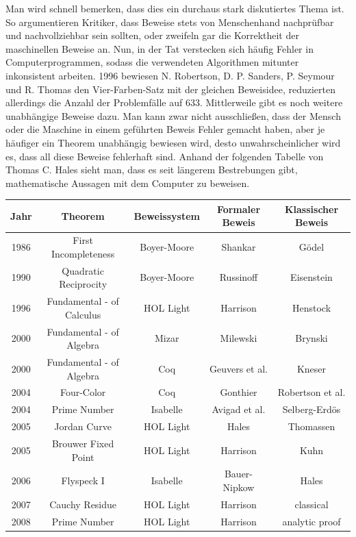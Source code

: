 Man wird schnell bemerken, dass dies ein durchaus stark diskutiertes Thema ist. So argumentieren Kritiker, dass Beweise stets von Menschenhand nachprüfbar und nachvollziehbar sein sollten, oder zweifeln gar die Korrektheit der maschinellen Beweise an. Nun, in der Tat verstecken sich häufig Fehler in Computerprogrammen, sodass die verwendeten Algorithmen mitunter inkonsistent arbeiten. 1996 bewiesen N. Robertson, D. P. Sanders, P. Seymour und R. Thomas den Vier-Farben-Satz mit der gleichen Beweisidee, reduzierten allerdings die Anzahl der Problemfälle auf 633. Mittlerweile gibt es noch weitere unabhängige Beweise dazu. Man kann zwar nicht ausschließen, dass der Mensch oder die Maschine in einem geführten Beweis Fehler gemacht haben, aber je häufiger ein Theorem unabhängig bewiesen wird, desto
unwahrscheinlicher wird es, dass all diese Beweise fehlerhaft sind. Anhand der folgenden Tabelle von Thomas C. Hales\cite{hales_formalproof} sieht man, dass es seit längerem Bestrebungen gibt, mathematische Aussagen mit dem Computer zu beweisen.

\begin{table}
\begin{tabular}{ccccc}
\toprule
Jahr & Theorem & Beweissystem & Formaler Beweis & Klassischer Beweis \\ \midrule
1986 & First Incompleteness & Boyer-Moore & Shankar & Gödel \\
1990 & Quadratic Reciprocity & Boyer-Moore & Russinoff & Eisenstein \\
1996 & Fundamental - of Calculus & HOL Light & Harrison & Henstock \\
2000 & Fundamental - of Algebra & Mizar & Milewski & Brynski \\
2000 & Fundamental - of Algebra & Coq & Geuvers et al. & Kneser \\
2004 & Four-Color & Coq & Gonthier & Robertson et al. \\
2004 & Prime Number & Isabelle & Avigad et al. & Selberg-Erdös \\
2005 & Jordan Curve & HOL Light & Hales & Thomassen \\
2005 & Brouwer Fixed Point & HOL Light & Harrison & Kuhn \\
2006 & Flyspeck I & Isabelle & Bauer-Nipkow & Hales \\
2007 & Cauchy Residue & HOL Light & Harrison & classical \\
2008 & Prime Number & HOL Light & Harrison & analytic proof \\
\bottomrule
\end{tabular}
\end{table}

